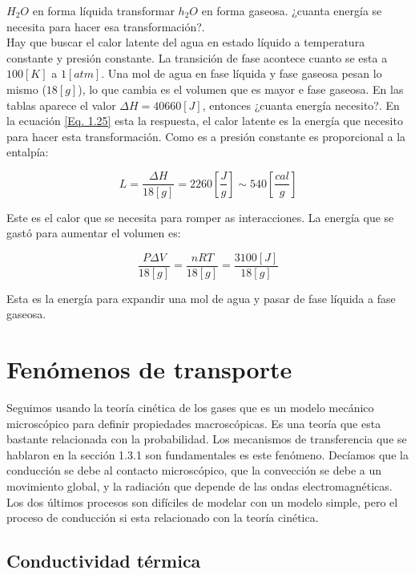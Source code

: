 \documentclass[11pt,fleqn]{book}
\begin{document}
\begin{exercise}
$H_{2}O$ en forma líquida transformar $h_{2}O$ en forma gaseosa. ¿cuanta energía se necesita para hacer esa transformación?. \\

Hay que buscar el calor latente del agua en estado líquido a temperatura constante y presión constante. La transición de fase acontece cuanto se esta a $100[K]$ a $1 [atm]$. Una mol de agua en fase líquida y fase gaseosa pesan lo mismo ($18 [g]$), lo que cambia es el volumen que es mayor e fase gaseosa. En las tablas aparece el valor $\Delta H=40660 [J]$, entonces ¿cuanta energía necesito?. En la ecuación \ref{Eq. 1.25} esta la respuesta, el calor latente es la energía que necesito para hacer esta transformación. Como es a presión constante es proporcional a la entalpía:

\begin{equation*}
    L=\frac{\Delta H}{18 [g]}=2260 [\frac{J}{g}]\sim540[\frac{cal}{g}]
\end{equation*}

Este es el calor que se necesita para romper as interacciones. La energía que se gastó para aumentar el volumen es:

\begin{equation*}
\frac{P\Delta  V}{18 [g]}=\frac{nRT}{18 [g]}=\frac{3100 [J]}{18 [g]}    
\end{equation*}

Esta es la energía para expandir una mol de agua y pasar de fase líquida a fase gaseosa. 
\end{exercise}

\section{Fenómenos de transporte}

Seguimos usando la teoría cinética de los gases que es un modelo mecánico microscópico para definir propiedades macroscópicas. Es una teoría que esta bastante relacionada con la probabilidad. Los mecanismos de transferencia que se hablaron en la sección 1.3.1 son fundamentales es este fenómeno. Decíamos que la conducción se debe al contacto microscópico, que la convección se debe a un movimiento global, y la radiación que depende de las ondas electromagnéticas. Los dos últimos procesos son difíciles de modelar con un modelo simple, pero el proceso de conducción si esta relacionado con la teoría cinética. 

\subsection{Conductividad térmica}
\end{document}
